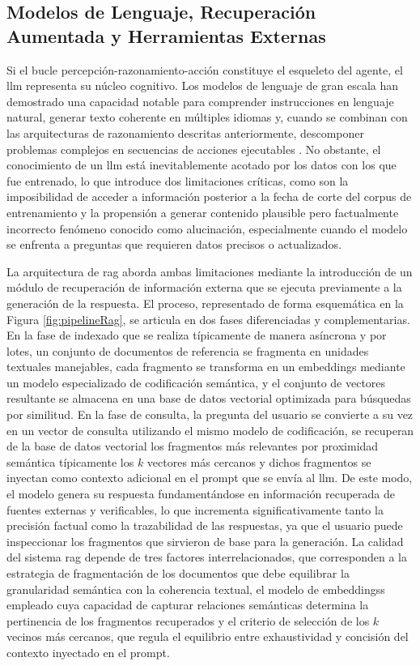 \subsection{Modelos de Lenguaje, Recuperación Aumentada y Herramientas Externas}
\label{subsec:llm-rag}

Si el bucle percepción-razonamiento-acción constituye el esqueleto del agente, el \gls{llm} representa su núcleo cognitivo. Los modelos de lenguaje de gran escala han demostrado una capacidad notable para comprender instrucciones en lenguaje natural, generar texto coherente en múltiples idiomas y, cuando se combinan con las arquitecturas de razonamiento descritas anteriormente, descomponer problemas complejos en secuencias de acciones ejecutables \cite{wei2022chain}. No obstante, el conocimiento de un \gls{llm} está inevitablemente acotado por los datos con los que fue entrenado, lo que introduce dos limitaciones críticas, como son la imposibilidad de acceder a información posterior a la fecha de corte del corpus de entrenamiento y la propensión a generar contenido plausible pero factualmente incorrecto fenómeno conocido como alucinación, especialmente cuando el modelo se enfrenta a preguntas que requieren datos precisos o actualizados.

La arquitectura de \gls{rag} \cite{lewis2020retrieval} aborda ambas limitaciones mediante la introducción de un módulo de recuperación de información externa que se ejecuta previamente a la generación de la respuesta. El proceso, representado de forma esquemática en la Figura \ref{fig:pipelineRag}, se articula en dos fases diferenciadas y complementarias. En la fase de indexado que se realiza típicamente de manera asíncrona y por lotes, un conjunto de documentos de referencia se fragmenta en unidades textuales manejables, cada fragmento se transforma en un \gls{embeddings} mediante un modelo especializado de codificación semántica, y el conjunto de vectores resultante se almacena en una base de datos vectorial optimizada para búsquedas por similitud. En la fase de consulta, la pregunta del usuario se convierte a su vez en un vector de consulta utilizando el mismo modelo de codificación, se recuperan de la base de datos vectorial los fragmentos más relevantes por proximidad semántica típicamente los $k$ vectores más cercanos y dichos fragmentos se inyectan como contexto adicional en el \gls{prompt} que se envía al \gls{llm}. De este modo, el modelo genera su respuesta fundamentándose en información recuperada de fuentes externas y verificables, lo que incrementa significativamente tanto la precisión factual como la trazabilidad de las respuestas, ya que el usuario puede inspeccionar los fragmentos que sirvieron de base para la generación. La calidad del sistema \gls{rag} depende de tres factores interrelacionados, que corresponden a la estrategia de fragmentación de los documentos que debe equilibrar la granularidad semántica con la coherencia textual, el modelo de \glspl{embeddings} empleado cuya capacidad de capturar relaciones semánticas determina la pertinencia de los fragmentos recuperados y el criterio de selección de los $k$ vecinos más cercanos, que regula el equilibrio entre exhaustividad y concisión del contexto inyectado en el \gls{prompt}.

